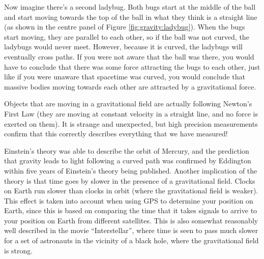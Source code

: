 
Now imagine there's a second ladybug. Both bugs start at the middle of the ball and start moving towards the top of the ball in what they think is a straight line (as shown in the centre panel of Figure \ref{fig:gravity:ladybug}). When the bugs start moving, they are parallel to each other, so if the ball was not curved, the ladybugs would never meet. However, because it is curved, the ladybugs will eventually cross paths. If you were not aware that the ball was there, you would have to conclude that there was some force attracting the bugs to each other, just like if you were unaware that spacetime was curved, you would conclude that massive bodies moving towards each other are attracted by a gravitational force.

Objects that are moving in a gravitational field are actually following Newton's First Law (they are moving at constant velocity in a straight line, and no force is exerted on them). It is strange and unexpected, but high precision measurements confirm that this correctly describes everything that we have measured!

Einstein's theory was able to describe the orbit of Mercury, and the prediction that gravity leads to light following a curved path was confirmed by Eddington within five years of Einstein's theory being published. Another implication of the theory is that time goes by slower in the presence of a gravitational field. Clocks on Earth run slower than clocks in orbit (where the gravitational field is weaker). This effect is taken into account when using GPS to determine your position on Earth, since this is based on comparing the time that it takes signals to arrive to your position on Earth from different satellites. This is also somewhat reasonably well described in the movie ``Interstellar'', where time is seen to pass much slower for a set of astronauts in the vicinity of a black hole, where the gravitational field is strong.

\newpage
